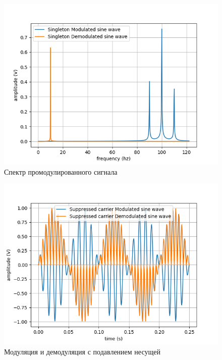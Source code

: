 \begin{figure}[H]
	\begin{center}
		\includegraphics[scale=0.7]{../out/Singleton_frequency.png}
		\caption{Спектр промодулированного сигнала} 
		\label{pic:sine_freq_0} %
	\end{center}
\end{figure}

\begin{figure}[H]
	\begin{center}
		\includegraphics[scale=0.7]{../out/Suppressed_time.png}
		\caption{Модуляция и демодуляция с подавлением несущей} 
		\label{pic:sine_time_1} %
	\end{center}
\end{figure}

